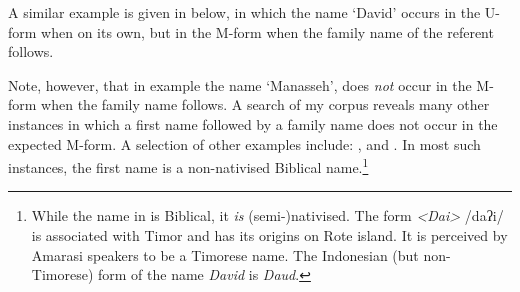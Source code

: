 A similar example is given in  below,
in which the name  `David' occurs in the U-form
when on its own, but in the M-form when the family name of the referent follows.

\begin{exe}
	\label{ex:130907-5}
\end{exe}

Note, however, that in example 
the name  `Manasseh',
does \emph{not} occur in the M-form when the family name  follows.
A search of my corpus reveals many other instances in which a first name followed
by a family name does not occur in the expected M-form.
A selection of other examples include: ,  and .
In most such instances, the first name is a non-nativised Biblical name.\footnote{
		While the name  in  is Biblical, it \emph{is} (semi-)nativised.
		The form \emph{<Da{\Q}i>} /daʔi/ is associated with Timor
		and has its origins on Rote island.
		It is perceived by Amarasi speakers to be a Timorese name.
		The Indonesian (but non-Timorese) form of the name \emph{David} is \emph{Daud}.}